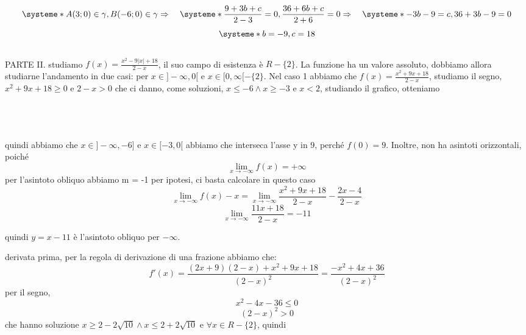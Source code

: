 \documentclass{article}
\begin{document}
\[
\systeme*{A(3;0) \in \gamma, B(-6;0)\in \gamma}  \Rightarrow \quad
\systeme*{\frac{9+3b+c}{2-3} = 0, \frac{36+6b+c}{2+6} = 0} \Rightarrow \quad
\systeme*{-3b -9 = c, 36 + 3b -9  = 0} 
\] 
\[
\systeme*{b = -9, c = 18} 
\]
\\
PARTE II.
studiamo
$f(x) = \frac{x^2 - 9|x| + 18}{2-x}$, il suo campo di esistenza è $R-\{2\}$. La funzione ha un valore assoluto, dobbiamo allora studiarne l'andamento in due casi: per $x \in ]-\infty, 0[$ e $x \in [0, \infty[ - \{2\}$.
Nel caso 1 abbiamo che $f(x) = \frac{x^2 + 9x + 18}{2-x}$, studiamo il segno, $x^2 + 9x + 18 \geq 0$ e $2-x > 0$
che ci danno, come soluzioni, $x \leq -6 \land x \geq -3$ e $x < 2$, studiando il grafico, otteniamo
\\\\
\\\\
quindi abbiamo che $x \in ]-\infty, -6]$ e $x \in [-3, 0[$
abbiamo che interseca l'asse y in 9, perché $f(0) = 9$.
Inoltre, non ha asintoti orizzontali, poiché
\[
\lim_{x \to -\infty} f(x) = +\infty
\]
per l'asintoto obliquo abbiamo m = -1 per ipotesi, ci basta calcolare in questo caso 
\[
\lim_{x\to-\infty} f(x)-x = \lim_{x\to-\infty}\frac{x^2 + 9x + 18}{2-x} - \frac{2x-4}{2-x}
\]
\[
\lim_{x\to-\infty}\frac{11x+18}{2-x} = -11
\]

quindi $y = x - 11$ è l'asintoto obliquo per $-\infty$.

derivata prima, per la regola di derivazione di una frazione abbiamo che:
\[
f'(x) = \frac{(2x+9)(2-x)+x^2+9x+18}{(2-x)^2} = \frac{-x^2+4x+36}{(2-x)^2}
\]
per il segno,
\[
x^2-4x-36 \leq 0
\]
\[
(2-x)^2 > 0
\]
che hanno soluzione $x \geq 2-2\sqrt{10} \land x \leq 2+2\sqrt{10}$ e $\forall x \in R-\{2\}$, quindi
\\\\
\\\\
\end{document}
